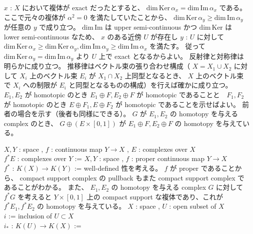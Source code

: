 \begin{Proof}
\itemprof
  \(x\) : \(X\) において複体が exact だったとすると、 \(\text{dim} \, \text{Ker} \, \alpha_x = \text{dim} \, \text{Im} \, \alpha_x\) である。
  ここで元々の複体が \(\alpha^2 = 0\) を満たしていたことから、 \(\text{dim} \, \text{Ker} \, \alpha_y \geq \text{dim} \, \text{Im} \, \alpha_y\) が任意の \(y\) で成り立つ。
  \(\text{dim} \, \text{Im}\) は upper semi-continuous かつ \(\text{dim} \, \text{Ker}\) は lower semi-continuous なため、 \(x\) のある近傍 \(U\) が存在し \(y\) : \(U\) に対して \(\text{dim} \, \text{Ker} \, \alpha_x \geq \text{dim} \, \text{Ker} \, \alpha_y , \text{dim} \, \text{Im} \, \alpha_y \geq \text{dim} \, \text{Im} \, \alpha_x\) を満たす。
  従って \(\text{dim} \, \text{Ker} \, \alpha_y = \text{dim} \, \text{Im} \, \alpha_y\) より \(U\) 上で exact となるからよい。
\itemprof
  反射律と対称律は明らかに成り立つ。
  推移律はベクトル束の張り合わせ構成（ \(X = X_1 \cup X_2\) に対して \(X_i\) 上のベクトル束 \(E_i\) が \(X_1 \cap X_2\) 上同型となるとき、 \(X\) 上のベクトル束で \(X_i\) への制限が \(E_i\) と同型となるものの構成）を行えば確かに成り立つ。
\itemprof
  \(E_1 , E_2\) が homotopic のとき \(E_1 \oplus F , E_2 \oplus F\) が homotopic であることと　\(F_1 , F_2\) が homotopic のとき \(E \oplus F_1 , E \oplus F_2\) が homotopic であることを示せばよい。
  前者の場合を示す（後者も同様にできる）。
  \(G\) が \(E_1,E_2\) の homotopy を与える complex のとき、 \(G \oplus (E \times [0,1])\) が \(E_1 \oplus F , E_2 \oplus F\) の homotopy を与えている。
\end{Proof}

\begin{Definition}[複体と写像]
\itemdefi
  \For \(X,Y\) : space , \(f\) : continuous map \(Y \to X\) , \(E\) : complexes over \(X\) \\
  \Define \(f^*E\) : complexes over \(Y\) := 
\itemdefi
  \For \(X,Y\) : space , \(f\) : proper continuous map \(Y \to X\) \\
  \Define \(f^*\) : \(K(X) \to K(Y)\) := 
\itemprof
  well-defined 性を考える。
  \(f\) が proper であることから、 compact support complex の pullback もまた compact support complex であることがわかる。
  また、 \(E_1,E_2\) の homotopy を与える complex \(G\) に対して \(f^*G\) を考えると \(Y \times [0,1]\) 上の compact support な複体であり、これが \(f^* E_1 , f^* E_2\) の homotopy を与えている。
\itemdefi
  \For \(X\) : space , \(U\) : open subset of \(X\) \\
  \Let \(i\) := inclusion of \(U \subset X\) \\
  \Define \(i_*\) : \(K(U) \to K(X)\) := 
\end{Definition}

